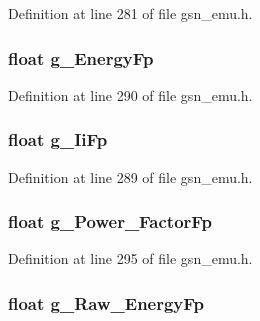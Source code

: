 Definition at line 281 of file gsn\_\-emu.h.

\hypertarget{a00059_a6fd1e0e5fd1f3b6d85711578d367360f}{
\subsubsection[{g\_\-EnergyFp}]{\setlength{\rightskip}{0pt plus 5cm}float {\bf g\_\-EnergyFp}}}
\label{a00059_a6fd1e0e5fd1f3b6d85711578d367360f}


Definition at line 290 of file gsn\_\-emu.h.

\hypertarget{a00059_adcad7e1a1f80df210c106db80efce24c}{
\subsubsection[{g\_\-IiFp}]{\setlength{\rightskip}{0pt plus 5cm}float {\bf g\_\-IiFp}}}
\label{a00059_adcad7e1a1f80df210c106db80efce24c}


Definition at line 289 of file gsn\_\-emu.h.

\hypertarget{a00059_a74170e1238d96263904d2c5e2b638994}{
\subsubsection[{g\_\-Power\_\-FactorFp}]{\setlength{\rightskip}{0pt plus 5cm}float {\bf g\_\-Power\_\-FactorFp}}}
\label{a00059_a74170e1238d96263904d2c5e2b638994}


Definition at line 295 of file gsn\_\-emu.h.

\hypertarget{a00059_abaff361f11436fef9186f8372635f88f}{
\subsubsection[{g\_\-Raw\_\-EnergyFp}]{\setlength{\rightskip}{0pt plus 5cm}float {\bf g\_\-Raw\_\-EnergyFp}}}
\label{a00059_abaff361f11436fef9186f8372635f88f}


